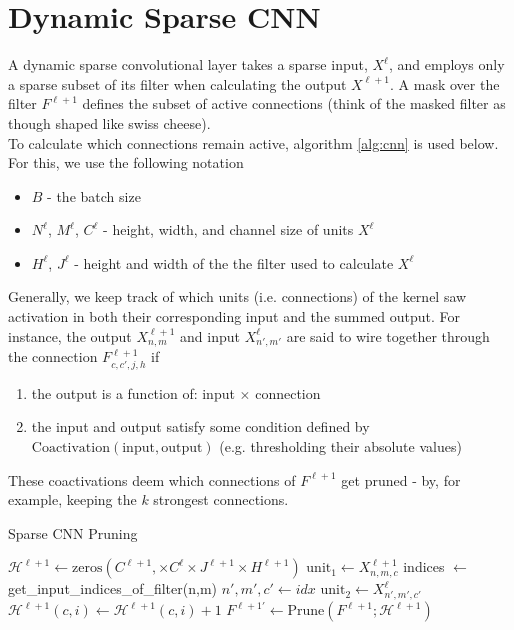 \documentclass{article}
\begin{document}

\section{Dynamic Sparse CNN}
A dynamic sparse convolutional layer takes a sparse input, $X^\ell$, and employs only a sparse subset of its filter when calculating the output $X^{\ell+1}$. A mask over the filter $F^{\ell+1}$ defines the subset of active connections (think of the masked filter as though shaped like swiss cheese). \\

To calculate which connections remain active, algorithm \ref{alg:cnn} is used below. For this, we use the following notation
\begin{itemize}
	\item $B$ - the batch size
	\item $N^{\ell}$, $M^{\ell}$, $C^{\ell}$ - height, width, and channel size of units $X^{\ell}$
	\item $H^{\ell}$, $J^{\ell}$ - height and width of the the filter used to calculate $X^{\ell}$
\end{itemize}

Generally, we keep track of which units (i.e. connections) of the kernel saw activation in both their corresponding input and the summed output. For instance, the output $X^{\ell+1}_{n,m}$ and input $X^{\ell}_{n',m'}$ are said to wire together through the connection $F^{\ell+1}_{c, c', j, h}$ if 
\begin{enumerate}
	\item the output is a function of: input $\times$ connection 
	\item the input and output satisfy some condition defined by $\text{Coactivation}(\text{input}, \text{output})$ (e.g. thresholding their absolute values)
\end{enumerate}
These coactivations deem which connections of $F^{\ell+1}$ get pruned - by, for example, keeping the $k$ strongest connections.

\begin{algorithm}
\caption{Sparse CNN Pruning}\label{alg:cnn}
\begin{algorithmic}[1]
\State $\mathcal{H}^{\ell+1} \gets \text{zeros}(C^{\ell+1}, \times C^{\ell} \times J^{\ell+1} \times H^{\ell+1})$ 
				\State $\text{unit}_1 \gets X^{\ell+1}_{n,m,c}$
					\State indices $\gets$ get\_input\_indices\_of\_filter(n,m)
						\State $n', m', c' \gets idx$
						\State $\text{unit}_2 \gets X^{\ell}_{n', m', c'}$
							\State $\mathcal{H}^{\ell+1}(c, i) \gets \mathcal{H}^{\ell+1}(c, i) + 1$
						\EndIf 
					\EndFor
			\EndFor
		\EndFor
	\EndFor
\EndFor
\State $F^{{\ell+1}'} \gets \text{Prune$(F^{\ell+1}; \mathcal{H}^{\ell+1})$}$

\end{algorithmic}
\end{algorithm}
\end{document}
